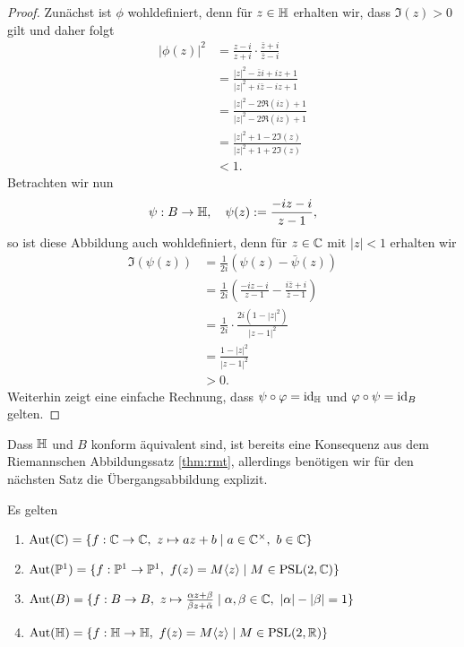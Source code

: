 \begin{proof}
  Zunächst ist $\phi$ wohldefiniert, denn für $z \in \mathbb{H}$ erhalten wir,
  dass $\Im(z) > 0$ gilt und daher folgt
  \begin{align*}
    |\phi(z)|^2 & = \frac{z-i}{z+i} \cdot \frac{\bar z + i}{\bar z -
      i} \\
    & = \frac{|z|^2 - \bar z i + i z + 1}{|z|^2 +i \bar z - i z + 1}
    \\
    & = \frac{|z|^2 - 2 \Re(iz) + 1}{|z|^2 - 2 \Re(iz) + 1} \\
    & = \frac{|z|^2 +1 - 2 \Im(z)}{|z|^2 + 1 + 2\Im(z)} \\
    & < 1.
  \end{align*}
  Betrachten wir nun
  \[
  \psi: B \rightarrow \mathbb{H}, \quad \psi(z) := \frac{ -iz - i}{z-1},
  \]
  so ist diese Abbildung auch wohldefiniert, denn für $z \in \mathbb{C}$ mit
  $|z| < 1$ erhalten wir
  \begin{align*}
    \Im(\psi(z)) & = \frac{1}{2i} ( \psi(z) - \bar \psi(z)) \\
    & = \frac{1}{2i} \left ( \frac{-iz - i}{z -1 } - \frac{ i \bar z +
        i}{\bar z - 1} \right ) \\
    & = \frac{1}{2i} \cdot \frac{2i ( 1- |z|^2 )}{|z -1|^2} \\
    & = \frac{1- |z|^2}{|z-1|^2} \\
    & > 0.
  \end{align*}
  Weiterhin zeigt eine einfache Rechnung, dass $\psi \circ \varphi =
  \operatorname{id}_{\mathbb{H}}$ und $\varphi \circ \psi = \operatorname{id}_B$ gelten.
\end{proof}

\begin{rem}
  Dass $\mathbb{H}$ und $B$ konform äquivalent sind, ist bereits eine
  Konsequenz aus dem Riemannschen Abbildungssatz \ref{thm:rmt}, allerdings benötigen
  wir für den nächsten Satz die Übergangsabbildung explizit.
\end{rem}

\begin{thm}
  \label{thm:aut}
  Es gelten
  \begin{enumerate}
  \item $\operatorname{Aut}(\mathbb{C}) = \{ f: \mathbb{C} \rightarrow \mathbb{C}, \ z \mapsto az + b \mid a \in
    \mathbb{C}^\times, \ b \in \mathbb{C} \}$
  \item $\Aut(\P^1) = \{ f: \P^1 \ra \P^1,\ f(z) = M\langle z \rangle \mid
    M \in \PSL(2, \C) \}$
  \item $\operatorname{Aut}(B) = \{ f: B \rightarrow B,\ z \mapsto \frac{\alpha z +
      \beta}{\bar \beta z + \bar \alpha} \mid \alpha, \beta \in \mathbb{C}, \
    |\alpha |- |\beta| = 1\}$
  \item $\operatorname{Aut}(\mathbb{H}) = \{f: \mathbb{H} \rightarrow \mathbb{H},\ f(z) = M\langle z \rangle 
    \mid M \in \operatorname{PSL}(2, \mathbb{R}) \}$
  \end{enumerate}
\end{thm}

